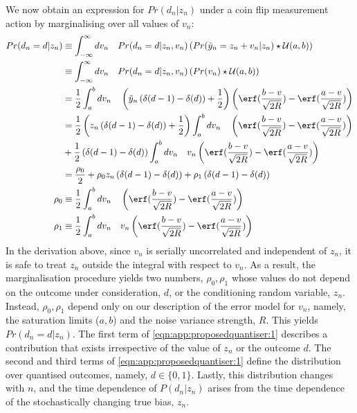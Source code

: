We now obtain an expression for $Pr(d_n | z_n)$ under a coin flip measurement action by marginalising over all values of $v_n$:
\begin{align}
Pr(d_n=d | z_n) & \equiv  \int_{-\infty}^{\infty} dv_n \quad  Pr(d_n=d | z_n, v_n) \left( Pr( \tilde{y}_n = z_n + v_n| z_n) \star \mathcal{U}(a,b) \right)  \\
& \equiv  \int_{-\infty}^{\infty} dv_n \quad  Pr(d_n=d | z_n, v_n) \left( Pr( v_n) \star \mathcal{U}(a,b) \right)  \\
& = \frac{1}{2} \int_{a}^{b} dv_n \quad  \left( \tilde{y}_n \left( \delta(d-1) - \delta(d) \right)  + \frac{1}{2} \right) 
\left(\erf(\frac{b-v}{\sqrt{2R}}) - \erf(\frac{a-v}{\sqrt{2R}})\right) \\
& = \frac{1}{2} \left( z_n \left( \delta(d-1) - \delta(d) \right)  + \frac{1}{2} \right)  \int_{a}^{b} dv_n \quad
\left(\erf(\frac{b-v}{\sqrt{2R}}) - \erf(\frac{a-v}{\sqrt{2R}})\right) \nonumber\\
& + \frac{1}{2}  \left( \delta(d-1) - \delta(d) \right) \int_{a}^{b} dv_n \quad  v_n  
\left(\erf(\frac{b-v}{\sqrt{2R}}) - \erf(\frac{a-v}{\sqrt{2R}})\right) \\
& =  \frac{\rho_0}{2}  + \rho_0 z_n \left( \delta(d-1) - \delta(d) \right)  + \rho_1 \left( \delta(d-1) - \delta(d) \right) \label{eqn:app:proposedquantiser:1} \\
\rho_0 & \equiv  \frac{1}{2}  \int_{a}^{b} dv_n \quad
\left(\erf(\frac{b-v}{\sqrt{2R}}) - \erf(\frac{a-v}{\sqrt{2R}})\right) \\
\rho_1 & \equiv \frac{1}{2}  \int_{a}^{b} dv_n \quad  v_n  
\left(\erf(\frac{b-v}{\sqrt{2R}}) - \erf(\frac{a-v}{\sqrt{2R}})\right)
\end{align}
In the derivation above, since $v_n$ is serially uncorrelated and independent of $z_n$, it is safe to treat $z_n$ outside the integral with respect to $v_n$. As a result, the marginalisation procedure yields two numbers, $\rho_0, \rho_1$ whose values do not depend on the outcome under consideration, $d$, or the conditioning random variable, $z_n$. Instead, $\rho_0, \rho_1$ depend only on our description of the error model for $v_n$, namely, the saturation limits ($a, b$) and the noise variance strength, $R$. 
This yields $ Pr(d_n=d | z_n) $. The first term of \cref{eqn:app:proposedquantiser:1} describes a contribution that exists irrespective of the value of $z_n$ or the outcome $d$. The second and third terms of \cref{eqn:app:proposedquantiser:1} define the  distribution over quantised outcomes, namely, $d \in \{ 0, 1\}$.  Lastly, this distribution changes with $n$, and the time dependence of $P(d_n|z_n)$ arises from the time dependence of the stochastically changing true bias, $z_n$. 


